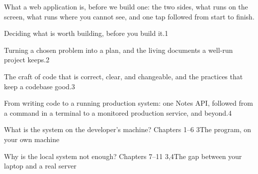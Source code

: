\documentclass[11pt, twoside, openright]{book}
\begin{document}


\frontmatter



\tableofcontents


\mainmatter



  {What a web application is, before we build one: the two sides, what runs on the
   screen, what runs where you cannot see, and one tap followed from start to finish.}







  {Deciding what is worth building, before you build it.}{1}


  {Turning a chosen problem into a plan, and the living documents a well-run project keeps.}{2}


  {The craft of code that is correct, clear, and changeable, and the practices that keep a
   codebase good.}{3}


  {From writing code to a running production system: one Notes API, followed from a command in
   a terminal to a monitored production service, and beyond.}{4}


  {What is the system on the developer's machine?}
  {Chapters 1–6}
  {3}{The program, on your own machine}







  {Why is the local system not enough?}
  {Chapters 7–11}
  {3,4}{The gap between your laptop and a real server}





\end{document}
